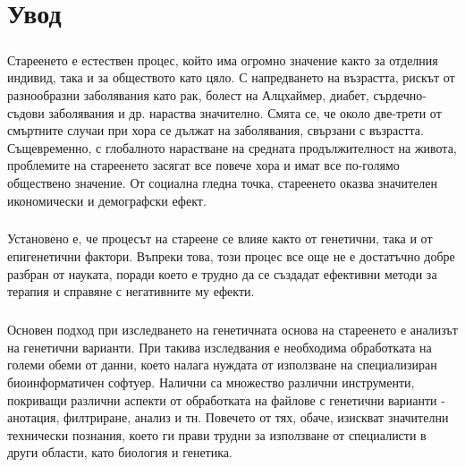 \documentclass[pdftex,cyrillic,14pt,a4page,book]{extreport}
\newcommand\blankpage{%
    \null
    \thispagestyle{empty}%
    \newpage}
\begin{document}
\afterpage{\blankpage}

\addtocounter{page}{1}

\tableofcontents
\pagebreak
\afterpage{\blankpage}




\chapter{Увод}
\paragraph{}

Стареенето е естествен процес, който има огромно значение както за отделния индивид, така и за обществото като цяло. С напредването на възрастта, рискът от разнообразни заболявания като рак, болест на Алцхаймер, диабет, сърдечно-съдови заболявания и др. нараства значително. Смята се, че около две-трети от смъртните случаи при хора се дължат на заболявания, свързани с възрастта. Същевременно, с глобалното нарастване на средната продължителност на живота, проблемите на стареенето засягат все повече хора и имат все по-голямо обществено значение. От социална гледна точка, стареенето оказва значителен икономически и демографски ефект.

\paragraph{}
Установено е, че процесът на стареене се влияе както от генетични, така и от епигенетични фактори. Въпреки това, този процес все още не е достатъчно добре разбран от науката, поради което е трудно да се създадат ефективни методи за терапия и справяне с негативните му ефекти.

\paragraph{}
Основен подход при изследването на генетичната основа на стареенето е анализът на генетични варианти. При такива изследвания е необходима обработката на големи обеми от данни, което налага нуждата от използване на специализиран биоинформатичен софтуер. Налични са множество различни инструменти, покриващи различни аспекти от обработката на файлове с генетични варианти - анотация, филтриране, анализ и тн. Повечето от тях, обаче, изискват значителни технически познания, което ги прави трудни за използване от специалисти в други области, като биология и генетика.
\end{document}
